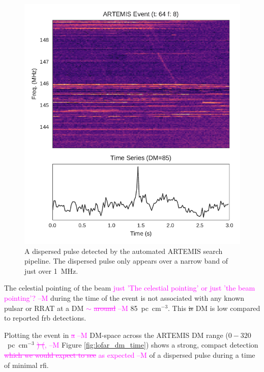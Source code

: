 \documentclass[a4paper,fleqn,usenatbib]{mnras}
\newcommand{\cM}[1]{\textcolor{magenta}{ #1 --M}}
\begin{document}
\begin{figure}
    \includegraphics[width=1.0\linewidth]{figures/LOFAR_dynamic.pdf}
    \caption{A dispersed pulse detected by the automated ARTEMIS search
    pipeline. The dispersed pulse only appears over a narrow band of just over
    1~MHz.
    }
    \label{fig:lofar_dynamic}
\end{figure}

The celestial pointing of the beam \cM{just 'The celestial pointing' or just 'the beam pointing'?} during the time of the event is not
associated with any known pulsar or RRAT at a DM\cM{$\sim$ \sout{around}} 85~pc~cm$^{-3}$. This \sout{is}
DM is low compared to reported \gls{frb} detections.

Plotting the event in \cM{\sout{a}} DM-space across the ARTEMIS DM range
($0-320$~pc~cm$^{-3}$\cM{\sout{) (},} Figure \ref{fig:lofar_dm_time}) shows a strong, compact
detection \cM{\sout{which we would expect to see} as expected} of a dispersed pulse during a time of
minimal \gls{rfi}.
\end{document}
